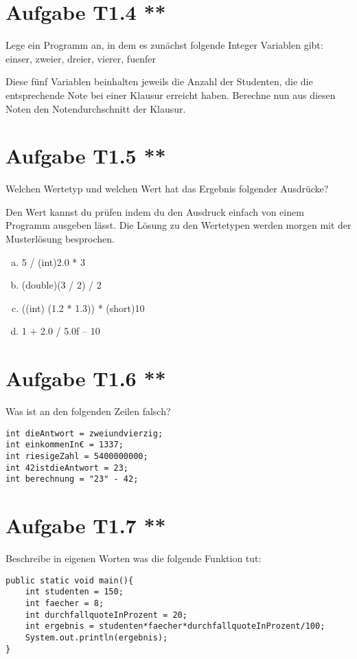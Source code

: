 \documentclass[final,a4paper]{article}
\begin{document}
\section*{Aufgabe T1.4 **}
Lege ein Programm an, in dem es zunächst folgende Integer Variablen gibt: einser, zweier, dreier, vierer, fuenfer

Diese fünf Variablen beinhalten jeweils die Anzahl der Studenten, die die entsprechende Note bei einer Klausur erreicht haben. Berechne nun aus diesen Noten den Notendurchschnitt der Klausur.

\section*{Aufgabe T1.5 **}
Welchen Wertetyp und welchen Wert hat das Ergebnis folgender Ausdrücke?

Den Wert kannst du prüfen indem du den Ausdruck einfach von einem Programm ausgeben lässt. Die Lösung zu den Wertetypen werden morgen mit der Musterlösung besprochen.
\begin{enumerate}[(a)]
\item 5 / (int)2.0 * 3
\item (double)(3 / 2) / 2
\item ((int) (1.2 * 1.3)) * (short)10
\item 1 + 2.0 / 5.0f – 10
\end{enumerate}

\section*{Aufgabe T1.6 **}
Was ist an den folgenden Zeilen falsch?
\begin{lstlisting}
int dieAntwort = zweiundvierzig;
int einkommenIn€ = 1337;
int riesigeZahl = 5400000000;
int 42istdieAntwort = 23;
int berechnung = "23" - 42;
\end{lstlisting}

\section*{Aufgabe T1.7 **}
Beschreibe in eigenen Worten was die folgende Funktion tut:
\begin{lstlisting}
public static void main(){
	int studenten = 150;
	int faecher = 8;
	int durchfallquoteInProzent = 20;
	int ergebnis = studenten*faecher*durchfallquoteInProzent/100;
	System.out.println(ergebnis);
}
\end{lstlisting}
\end{document}
